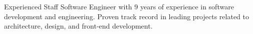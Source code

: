 \begin{cvletter}
	{Experienced Staff Software Engineer with 9 years of experience in software development and engineering. Proven track record in leading projects related to architecture, design, and front-end development.}
\end{cvletter}
